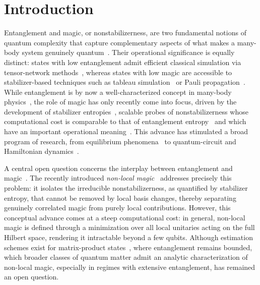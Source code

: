\documentclass[prx,twocolumn,superscriptaddress,aps,10pt, frontmatterverbose, reprint,footinbib,longbibliography=true]{revtex4-2}
\begin{document}
\maketitle

\section{Introduction}
Entanglement and magic, or nonstabilizerness, are two fundamental notions of quantum complexity that capture complementary aspects of what makes a many-body system genuinely quantum~\cite{Horodecki2009,Chitambar2019resources,Veitch2014resource}.
Their operational significance is equally distinct: states with low entanglement admit efficient classical simulation via tensor-network methods~\cite{Schollw_ck_2011}, whereas states with low magic are accessible to stabilizer-based techniques such as tableau simulation~\cite{Gottesman1998,Bravyi2019simulationofquantum} or Pauli propagation~\cite{dowling2025magic,rudolph2025paulipropagationcomputationalframework}.
While entanglement is by now a well-characterized concept in many-body physics~\cite{Laflorencie_2016,amico2008entanglement}, the role of magic has only recently come into focus, driven by the development of stabilizer entropies~\cite{Leone2022SRE,leone2024stabilizer}, scalable probes of nonstabilizerness whose computational cost is comparable to that of entanglement entropy~\cite{huang2026fastexactapproachstabilizer,xiao2026exponentiallyacceleratedsamplingpauli,sierant2026computingquantummagicstate} and which have an important operational meaning~\cite{Bittel_2026, Iannotti_2026, cusumano2025nonstabilizernessviolationschshinequalities}.
This advance has stimulated a broad program of research, from equilibrium phenomena~\cite{piro2,tarabunga2023manybody,oshino2026stabilizer,hoshino2025stabilizerrenyientropyencodes, aditya2025mpembaeffectsquantumcomplexity} to quantum-circuit and Hamiltonian dynamics~\cite{Turkeshi_2025,odavic2025stabilizer,tirrito2025anticoncentration,falcao2025nonstabilizerness, PhysRevB.106.214316, p8dn-glcw, lio2026quantumstatedesignsmagic, aditya2025growthspreadingquantumresources, Viscardi_2026}.

A central open question concerns the interplay between entanglement and magic~\cite{tirrito2024quantifying,szombathy,Iannotti2025entanglement}.
The recently introduced \emph{non-local magic}~\cite{Cao_2025,qian2025quantumnonlocalnonstabilizerness, munizzi2026magicnoncliffordgatestopological, cao2024non} addresses precisely this problem: it isolates the irreducible nonstabilizerness, as quantified by stabilizer entropy, that cannot be removed by local basis changes, thereby separating genuinely correlated magic from purely local contributions.
However, this conceptual advance comes at a steep computational cost: in general, non-local magic is defined through a minimization over all local unitaries acting on the full Hilbert space, rendering it intractable beyond a few qubits. 
Although estimation schemes exist for matrix-product states~\cite{Cao_2025}, where entanglement remains bounded, which broader classes of quantum matter admit an analytic characterization of non-local magic, especially in regimes with extensive entanglement, has remained an open question.
\end{document}

